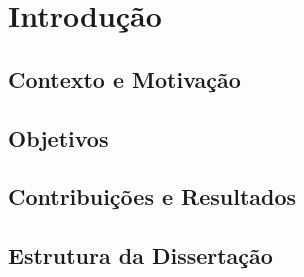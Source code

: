 \chapter{Introdu\c{c}\~ao}
\label{chap:introducao}

\section{Contexto e Motiva\c{c}\~ao}
\label{sec:intro-contexto}

\section{Objetivos}
\label{sec:intro-objetivos}

\section{Contribui\c{c}\~oes e Resultados}
\label{sec:intro-contribuicoes}

\section{Estrutura da Disserta\c{c}\~ao}
\label{sec:intro-estrutura}
